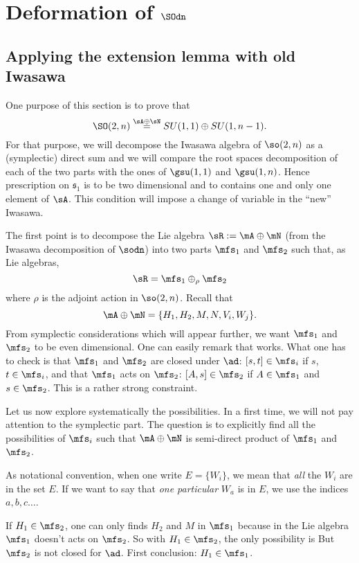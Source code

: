 \section{Deformation of \texorpdfstring{$\SOdn$}{SO2n}}   \label{SecUnifSOdn}

\subsection{Applying the extension lemma with old Iwasawa}

One purpose of this section is to prove that
\[
  \SO(2,n)\stackrel{\sA\oplus\sN}{=}SU(1,1)\oplus SU(1,n-1).
\]
For that purpose, we will decompose the Iwasawa algebra of $\so(2,n)$ as a (symplectic) direct sum and we will compare the root spaces decomposition of each of the two parts with the ones of $\gsu(1,1)$ and $\gsu(1,n)$. Hence prescription on $\mathfrak{s}_1$ is to be two dimensional and to contains one and only one element of $\sA$. This condition will impose a change of variable in the ``new'' Iwasawa.

The first point is to decompose the Lie algebra $\sR:=\mA\oplus\mN$ (from the Iwasawa decomposition of
 $\sodn$) into two parts $\mfs_1$ and $\mfs_2$ such that, as Lie algebras,
\[
  \sR=\mfs_1\oplus_{\rho}\mfs_2
\]
where $\rho$ is the adjoint action in $\so(2,n)$. Recall that
\[
   \mA\oplus\mN=\{H_1,H_2,M,N,V_i,W_j\}.
\]
From symplectic considerations which will appear further, we want $\mfs_1$ and $\mfs_2$ to be even dimensional.
One can easily remark that
works. What one has to check is that $\mfs_1$ and $\mfs_2$ are closed under $\ad$: $[s,t]\in\mfs_i$ if $s$, $t\in\mfs_i$, and that $\mfs_1$ acts on $\mfs_2$: $[A,s]\in\mfs_2$ if $A\in\mfs_1$ and $s\in\mfs_2$. This is a rather strong constraint.

Let us now explore systematically the possibilities. In a first time, we will not pay attention to the symplectic part. The question is to explicitly find all the possibilities of $\mfs_i$ such that $\mA\oplus\mN$ is semi-direct product of $\mfs_1$ and $\mfs_2$.

As notational convention, when one write $E=\{W_i\}$, we mean that \emph{all} the $W_i$ are in the set $E$. If we want to say that \emph{one particular} $W_a$ is in $E$, we use the indices $a,b,c\ldots$.

If $H_1\in\mfs_2$, one can only finds $H_2$ and $M$ in $\mfs_1$ because in
the Lie algebra $\mfs_1$ doesn't acts on $\mfs_2$. So with $H_1\in\mfs_2$, the only possibility is
But $\mfs_2$ is not closed for $\ad$. First conclusion: $H_1\in\mfs_1$.

